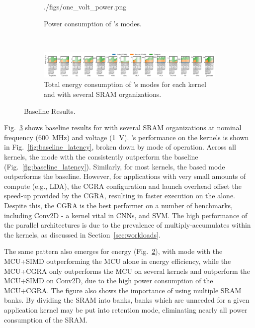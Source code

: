 \begin{figure}[h]
\begin{subfigure}{0.3\textwidth}
            {./figs/one_volt_power.png}
        \caption{\small Power consumption of \arch{}'s modes.}
        \label{fig:baseline_power}
    \end{subfigure}
    \\
    \begin{subfigure}{\linewidth}
        \centering
        \includegraphics[width=1.0\linewidth, height=0.25\textwidth]
            {./figs/one_volt_total_energy.png}
        \caption{\small Total energy consumption of \arch{}'s modes
        for each kernel and with several SRAM organizations.}
        \label{fig:baseline_energy}
    \end{subfigure}
    \caption{\small Baseline Results.}
    \label{fig:baseline_results}
\end{figure}


Fig.~\ref{fig:baseline_results} shows baseline results for \arch{} with several
SRAM organizations at nominal frequency (\SI{600}{\mega\hertz}) and voltage
(\SI{1}{\volt}). \arch{}'s performance on the kernels is shown in
Fig.~\ref{fig:baseline_latency}, broken down by \arch{} mode of operation.
Across all kernels, the mode with the \vmacc{} consistently outperform
the \mcu{} baseline (Fig.~\ref{fig:baseline_latency}). Similarly, for most
kernels, the \cgra{} based mode outperforms the \mcu{} baseline.
However, for applications with very small amounts of compute (e.g., LDA), the
CGRA configuration and launch overhead offset the speed-up provided by the
CGRA, resulting in faster execution on the \mcu{} alone. Despite this, the CGRA
is the best performer on a number of benchmarks, including Conv2D - a kernel
vital in CNNs, and SVM. The high performance of the parallel architectures is
due to the prevalence of multiply-accumulates within the kernels, as discussed
in Section~\ref{sec:workloads}.

The same pattern also emerges for energy (Fig.~\ref{fig:baseline_energy}), with
mode with the MCU+SIMD outperforming the MCU alone in energy efficiency, while
the MCU+CGRA only outperforms the MCU on several kernels and outperform the
MCU+SIMD on Conv2D, due to the high power consumption of the MCU+CGRA. The
figure also shows the importance of using multiple SRAM banks. By dividing the
SRAM into banks, banks which are unneeded for a given application kernel may be
put into retention mode, eliminating nearly all power consumption of the SRAM.

